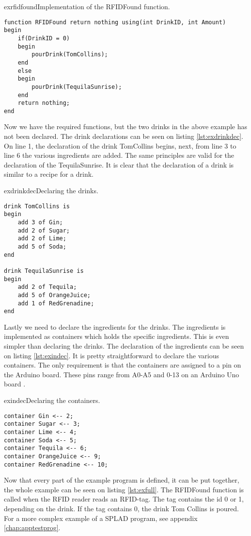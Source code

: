 \begin{code}{exrfidfound}{Implementation of the RFIDFound function.}
\begin{lstlisting}
function RFIDFound return nothing using(int DrinkID, int Amount)
begin
	if(DrinkID = 0)
	begin
		pourDrink(TomCollins);
	end
	else
	begin
		pourDrink(TequilaSunrise);
	end
	return nothing;
end
\end{lstlisting}
\end{code}

Now we have the required functions, but the two drinks in the above example has not been declared. The drink declarations can be seen on listing \ref{lst:exdrinkdec}. On line 1, the declaration of the drink TomCollins begins, next, from line 3 to line 6 the various ingredients are added. The same principles are valid for the declaration of the TequilaSunrise. It is clear that the declaration of a drink is similar to a recipe for a drink. 

\begin{code}{exdrinkdec}{Declaring the drinks.}
\begin{lstlisting}
drink TomCollins is
begin
	add 3 of Gin;
	add 2 of Sugar;
	add 2 of Lime;
	add 5 of Soda;
end

drink TequilaSunrise is 
begin
	add 2 of Tequila;
	add 5 of OrangeJuice;
	add 1 of RedGrenadine;
end
\end{lstlisting}
\end{code}

Lastly we need to declare the ingredients for the drinks. The ingredients is implemented as containers which holds the specific ingredients. This is even simpler than declaring the drinks. The declaration of the ingredients can be seen on listing \ref{lst:exindec}. It is pretty straightforward to declare the various containers. The only requirement is that the containers are assigned to a pin on the Arduino board. These pins range from A0-A5 and 0-13 on an Arduino Uno board \citep{ArduinoUno}.

\begin{code}{exindec}{Declaring the containers.}
\begin{lstlisting}
container Gin <-- 2;
container Sugar <-- 3;
container Lime <-- 4;
container Soda <-- 5;
container Tequila <-- 6;
container OrangeJuice <-- 9;
container RedGrenadine <-- 10;
\end{lstlisting}
\end{code}

Now that every part of the example program is defined, it can be put together, the whole example can be seen on listing \ref{lst:exfull}. The RFIDFound function is called when the RFID reader reads an RFID-tag. The tag contains the id 0 or 1, depending on the drink. If the tag contains 0, the drink Tom Collins is poured. For a more complex example of a SPLAD program, see appendix \ref{chap:apptestprog}.


